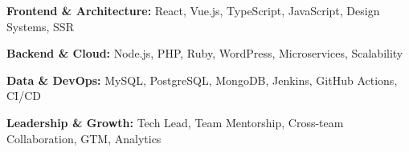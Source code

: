 
\begin{center}
\begin{cvparagraph}
\begin{cvitems}
  \item \textbf{Frontend \& Architecture:} React, Vue.js, TypeScript, JavaScript, Design Systems, SSR
  \item \textbf{Backend \& Cloud:} Node.js, PHP, Ruby, WordPress, Microservices, Scalability  
  \item \textbf{Data \& DevOps:} MySQL, PostgreSQL, MongoDB, Jenkins, GitHub Actions, CI/CD
  \item \textbf{Leadership \& Growth:} Tech Lead, Team Mentorship, Cross-team Collaboration, GTM, Analytics
\end{cvitems}
\end{cvparagraph}
\end{center}

